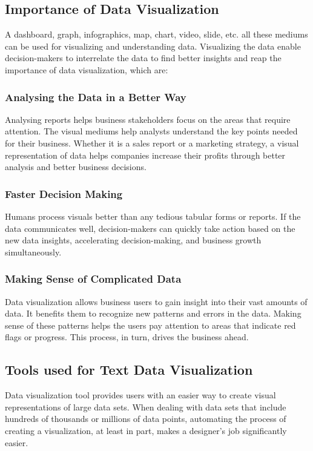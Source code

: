 \documentclass[a4paper,12pt]{report}
\begin{document}
    \subsection{Importance of Data Visualization}
    A dashboard, graph, infographics, map, chart, video, slide, etc. all these mediums can be used for visualizing and understanding data. Visualizing the data enable decision-makers to interrelate the data to find better insights and reap the importance of data visualization\cite{DataVizImportance}, which are:
    \subsubsection{Analysing the Data in a Better Way}
    Analysing reports helps business stakeholders focus on the areas that require attention. The visual mediums help analysts understand the key points needed for their business. Whether it is a sales report or a marketing strategy, a visual representation of data helps companies increase their profits through better analysis and better business decisions.
    \subsubsection{Faster Decision Making}
    Humans process visuals better than any tedious tabular forms or reports. If the data communicates well, decision-makers can quickly take action based on the new data insights, accelerating decision-making, and business growth simultaneously.
    \subsubsection{Making Sense of Complicated Data}
    Data visualization allows business users to gain insight into their vast amounts of data. It benefits them to recognize new patterns and errors in the data. Making sense of these patterns helps the users pay attention to areas that indicate red flags or progress. This process, in turn, drives the business ahead.

    \subsection{Tools used for Text Data Visualization}
    Data visualization tool provides users with an easier way to create visual representations of large data sets. When dealing with data sets that include hundreds of thousands or millions of data points, automating the process of creating a visualization, at least in part, makes a designer’s job significantly easier.
\end{document}
